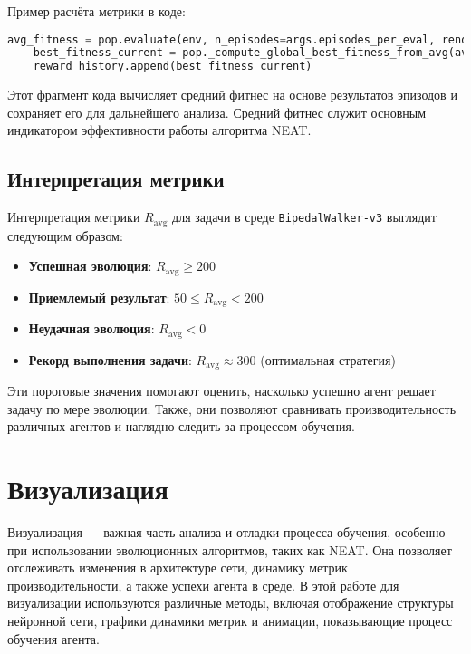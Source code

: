 \documentclass[a4paper,12pt]{article}
\begin{document}
Пример расчёта метрики в коде:

\begin{lstlisting}[language=Python]
    avg_fitness = pop.evaluate(env, n_episodes=args.episodes_per_eval, render=False)
    best_fitness_current = pop._compute_global_best_fitness_from_avg(avg_fitness)
    reward_history.append(best_fitness_current)
\end{lstlisting}

Этот фрагмент кода вычисляет средний фитнес на основе результатов эпизодов и сохраняет его для дальнейшего анализа. Средний фитнес служит основным индикатором эффективности работы алгоритма NEAT.

\subsection{Интерпретация метрики}

Интерпретация метрики $R_{\text{avg}}$ для задачи в среде \texttt{BipedalWalker-v3} выглядит следующим образом:
\begin{itemize}
    \item \textbf{Успешная эволюция}: $R_{\text{avg}} \geq 200$
    \item \textbf{Приемлемый результат}: $50 \leq R_{\text{avg}} < 200$
    \item \textbf{Неудачная эволюция}: $R_{\text{avg}} < 0$
    \item \textbf{Рекорд выполнения задачи}: $R_{\text{avg}} \approx 300$ (оптимальная стратегия)
\end{itemize}

Эти пороговые значения помогают оценить, насколько успешно агент решает задачу по мере эволюции. Также, они позволяют сравнивать производительность различных агентов и наглядно следить за процессом обучения.

\newpage
\section{Визуализация}

Визуализация — важная часть анализа и отладки процесса обучения, особенно при использовании эволюционных алгоритмов, таких как NEAT. Она позволяет отслеживать изменения в архитектуре сети, динамику метрик производительности, а также успехи агента в среде. В этой работе для визуализации используются различные методы, включая отображение структуры нейронной сети, графики динамики метрик и анимации, показывающие процесс обучения агента.
\end{document}
